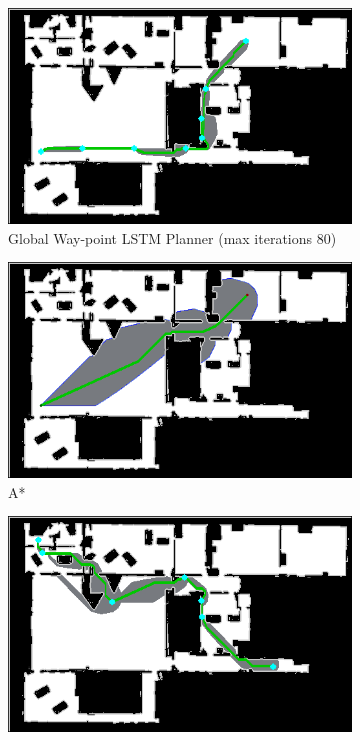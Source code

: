 \begin{figure}[]
  \centering
  \begin{subfigure}[b]{0.48\linewidth}
    \includegraphics[width=\linewidth]{images/screenshot_134.png}
     \caption{Global Way-point LSTM Planner (max iterations 80)}
  \end{subfigure}
  \hfill
  \begin{subfigure}[b]{0.48\linewidth}
    \includegraphics[width=\linewidth]{images/screenshot_107.png}
     \caption{A*\newline}
  \end{subfigure}
  \hfill
  \begin{subfigure}[b]{0.48\linewidth}
    \includegraphics[width=\linewidth]{images/screenshot_137.png}

\end{subfigure}
\end{figure}
